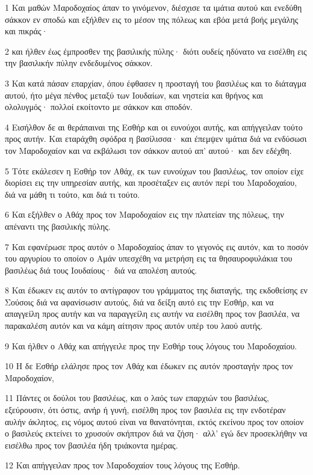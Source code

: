 \par 1 Και μαθών Μαροδοχαίος άπαν το γινόμενον, διέσχισε τα ιμάτια αυτού και ενεδύθη σάκκον εν σποδώ και εξήλθεν εις το μέσον της πόλεως και εβόα μετά βοής μεγάλης και πικράς·
\par 2 και ήλθεν έως έμπροσθεν της βασιλικής πύλης· διότι ουδείς ηδύνατο να εισέλθη εις την βασιλικήν πύλην ενδεδυμένος σάκκον.
\par 3 Και κατά πάσαν επαρχίαν, όπου έφθασεν η προσταγή του βασιλέως και το διάταγμα αυτού, ήτο μέγα πένθος μεταξύ των Ιουδαίων, και νηστεία και θρήνος και ολολυγμός· πολλοί εκοίτοντο με σάκκον και σποδόν.
\par 4 Εισήλθον δε αι θεράπαιναι της Εσθήρ και οι ευνούχοι αυτής, και απήγγειλαν τούτο προς αυτήν. Και εταράχθη σφόδρα η βασίλισσα· και έπεμψεν ιμάτια διά να ενδύσωσι τον Μαροδοχαίον και να εκβάλωσι τον σάκκον αυτού απ' αυτού· και δεν εδέχθη.
\par 5 Τότε εκάλεσεν η Εσθήρ τον Αθάχ, εκ των ευνούχων του βασιλέως, τον οποίον είχε διορίσει εις την υπηρεσίαν αυτής, και προσέταξεν εις αυτόν περί του Μαροδοχαίου, διά να μάθη τι τούτο, και διά τι τούτο.
\par 6 Και εξήλθεν ο Αθάχ προς τον Μαροδοχαίον εις την πλατείαν της πόλεως, την απέναντι της βασιλικής πύλης.
\par 7 Και εφανέρωσε προς αυτόν ο Μαροδοχαίος άπαν το γεγονός εις αυτόν, και το ποσόν του αργυρίου το οποίον ο Αμάν υπεσχέθη να μετρήση εις τα θησαυροφυλάκια του βασιλέως διά τους Ιουδαίους· διά να απολέση αυτούς.
\par 8 Και έδωκεν εις αυτόν το αντίγραφον του γράμματος της διαταγής, της εκδοθείσης εν Σούσοις διά να αφανίσωσιν αυτούς, διά να δείξη αυτό εις την Εσθήρ, και να απαγγείλη προς αυτήν και να παραγγείλη εις αυτήν να εισέλθη προς τον βασιλέα, να παρακαλέση αυτόν και να κάμη αίτησιν προς αυτόν υπέρ του λαού αυτής.
\par 9 Και ήλθεν ο Αθάχ και απήγγειλε προς την Εσθήρ τους λόγους του Μαροδοχαίου.
\par 10 Η δε Εσθήρ ελάλησε προς τον Αθάχ και έδωκεν εις αυτόν προσταγήν προς τον Μαροδοχαίον,
\par 11 Πάντες οι δούλοι του βασιλέως, και ο λαός των επαρχιών του βασιλέως, εξεύρουσιν, ότι όστις, ανήρ ή γυνή, εισέλθη προς τον βασιλέα εις την ενδοτέραν αυλήν άκλητος, εις νόμος αυτού είναι να θανατόνηται, εκτός εκείνου προς τον οποίον ο βασιλεύς εκτείνει το χρυσούν σκήπτρον διά να ζήση· αλλ' εγώ δεν προσεκλήθην να εισέλθω προς τον βασιλέα ήδη τριάκοντα ημέρας.
\par 12 Και απήγγειλαν προς τον Μαροδοχαίον τους λόγους της Εσθήρ.
